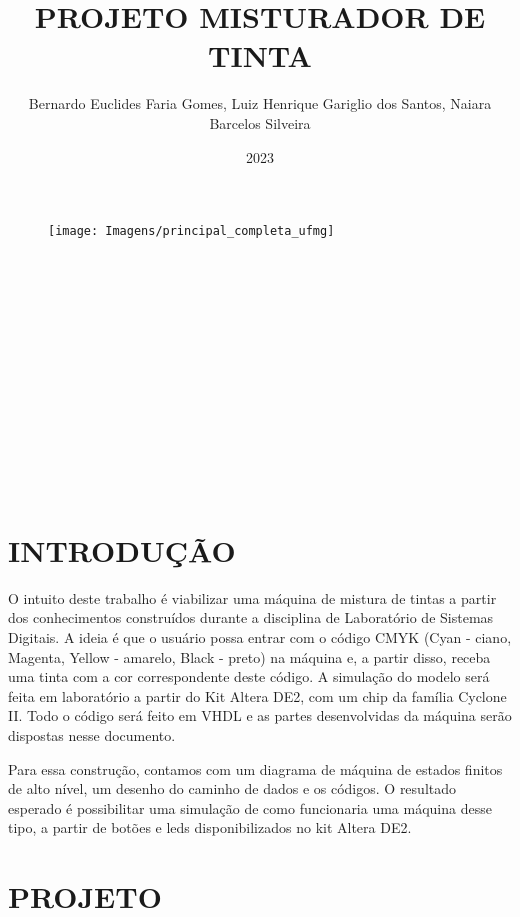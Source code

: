 \documentclass[12pt,a4paper,oneside]{abntex2}
\author{Bernardo Euclides Faria Gomes, Luiz Henrique Gariglio dos Santos, Naiara Barcelos Silveira}
\title{PROJETO MISTURADOR DE TINTA}
\date{2023}
\renewcommand{\imprimircapa}{
	\begin{capa}
		\begin{center}
            \begin{figure}[h]
				\centering
				\texttt{[image: Imagens/principal\_completa\_ufmg]}
				\label{fig:principalcompletaufmg}
			\end{figure}
            \vspace{4cm}
    		{\normalsize\imprimirautor}\\[4cm]
    		{\normalsize\textbf{\imprimirtitulo}}\\
    		\vfill
    		{\normalsize\imprimirlocal}\\
    		{\normalsize\imprimirdata}
        \end{center}		
	\end{capa}
}
\newcommand{\folhaderostonova}{
	\begin{center}
        {\normalsize \imprimirautor } \\[5cm]
    	{\normalsize \textbf{\imprimirtitulo}} \\[4.5cm]
    	\hspace{.45 \textwidth} %
    	\begin{minipage}{.5\textwidth}
    		\imprimirpreambulo \\ \\
    	  \imprimirorientador \\ \\
    	\end{minipage}
    	\center
    	\vfill
    	{\normalsize \imprimirlocal } \\
    	{\normalsize \imprimirdata}
    \end{center}
}
\begin{document}
	\imprimircapa
	\folhaderostonova
	\newpage
	\listoffigures*
	\newpage
	\listoftables*
	\tableofcontents* \thispagestyle{empty} %
	\mainmatter %
	
	\chapter{INTRODUÇÃO}
        O intuito deste trabalho é viabilizar uma máquina de mistura de tintas a partir dos conhecimentos construídos durante a disciplina de Laboratório de Sistemas Digitais. A ideia é que o usuário possa entrar com o código CMYK (Cyan - ciano, Magenta, Yellow - amarelo, Black - preto) na máquina e, a partir disso, receba uma tinta com a cor correspondente deste código. A simulação do modelo será feita em laboratório a partir do Kit Altera DE2, com um chip da família Cyclone II. Todo o código será feito em VHDL e as partes desenvolvidas da máquina serão dispostas nesse documento. \par
        Para essa construção, contamos com um diagrama de máquina de estados finitos de alto nível, um desenho do caminho de dados e os códigos. O resultado esperado é possibilitar uma simulação de como funcionaria uma máquina desse tipo, a partir de botões e leds disponibilizados no kit Altera DE2.
        
	\chapter{PROJETO}
\end{document}
